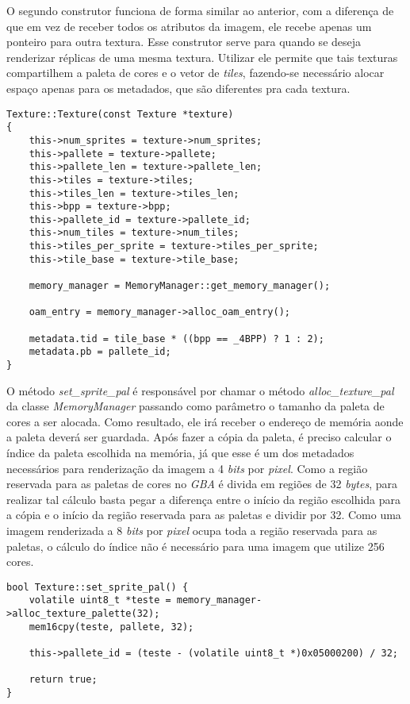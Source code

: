 O segundo construtor funciona de forma similar ao anterior, com a diferença de que em vez de receber todos os atributos da imagem, ele recebe apenas um ponteiro para outra textura. Esse construtor serve para quando se deseja renderizar réplicas de uma mesma textura. Utilizar ele permite que tais texturas compartilhem a paleta de cores e o vetor de \textit{tiles}, fazendo-se necessário alocar espaço apenas para os metadados, que são diferentes pra cada textura.

\begin{lstlisting}[float,caption={Construtor por cópia da classe \textit{Texture}.}]
Texture::Texture(const Texture *texture)
{
    this->num_sprites = texture->num_sprites;
    this->pallete = texture->pallete;
    this->pallete_len = texture->pallete_len;
    this->tiles = texture->tiles;
    this->tiles_len = texture->tiles_len;
    this->bpp = texture->bpp;
    this->pallete_id = texture->pallete_id;
    this->num_tiles = texture->num_tiles;
    this->tiles_per_sprite = texture->tiles_per_sprite;
    this->tile_base = texture->tile_base;

    memory_manager = MemoryManager::get_memory_manager();

    oam_entry = memory_manager->alloc_oam_entry();

    metadata.tid = tile_base * ((bpp == _4BPP) ? 1 : 2);
    metadata.pb = pallete_id;
}
\end{lstlisting}

O método \textit{set\_sprite\_pal} é responsável por chamar o método \textit{alloc\_texture\_pal} da classe \textit{MemoryManager} passando como parâmetro o tamanho da paleta de cores a ser alocada. Como resultado, ele irá receber o endereço de memória aonde a paleta deverá ser guardada. Após fazer a cópia da paleta, é preciso calcular o índice da paleta escolhida na memória, já que esse é um dos metadados necessários para renderização da imagem a 4 \textit{bits} por \textit{pixel}. Como a região reservada para as paletas de cores no \textit{GBA} é divida em regiões de 32 \textit{bytes}, para realizar tal cálculo basta pegar a diferença entre o início da região escolhida para a cópia e o início da região reservada para as paletas e dividir por 32.
Como uma imagem renderizada a 8 \textit{bits} por \textit{pixel} ocupa toda a região reservada para as paletas, o cálculo do índice não é necessário para uma imagem que utilize 256 cores.

\begin{lstlisting}[float,caption={Função de alocação da paleta de cores de uma textura.}]
bool Texture::set_sprite_pal() {
    volatile uint8_t *teste = memory_manager->alloc_texture_palette(32);
    mem16cpy(teste, pallete, 32);

    this->pallete_id = (teste - (volatile uint8_t *)0x05000200) / 32;

    return true;
}
\end{lstlisting}

